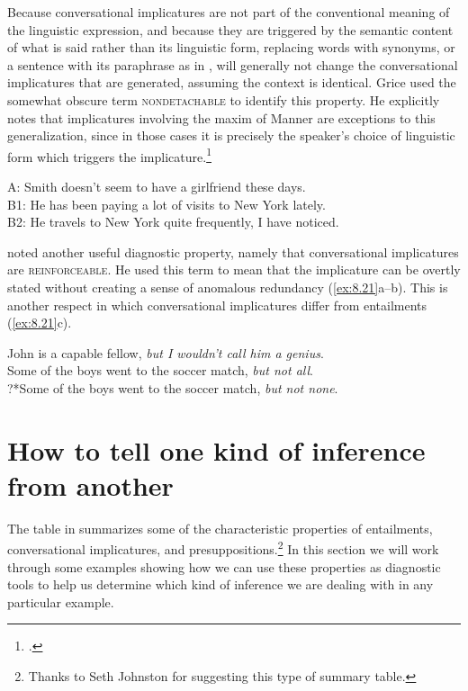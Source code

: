 Because conversational implicatures are not part of the conventional meaning of the linguistic expression, and because they are triggered by the semantic content of what is said rather than its linguistic form, replacing words with synonyms, or a sentence with its paraphrase as in , will generally not change the conversational implicatures that are generated, assuming the context is identical. Grice used the somewhat obscure term \textsc{nondetachable} to identify this property. He explicitly notes that implicatures involving the maxim of Manner are exceptions to this generalization, since in those cases it is precisely the speaker’s choice of linguistic form which triggers the implicature.\footnote{\citet[58]{Grice1975}.}


\ea \label{ex:8.20}
A: Smith doesn’t seem to have a girlfriend these days.\\
B1: He has been paying a lot of visits to New York lately.\\
B2: He travels to New York quite frequently, I have noticed.
\z


\citet[294]{Sadock1978} noted another useful diagnostic property, namely that conversational implicatures are \textsc{reinforceable}. He used this term to mean that the implicature can be overtly stated without creating a sense of anomalous redundancy (\ref{ex:8.21}a--b). This is another respect in which conversational implicatures differ from entailments (\ref{ex:8.21}c).


\ea \label{ex:8.21}
\ea John is a capable fellow, \textit{but I wouldn’t call him a genius}.\\
\ex Some of the boys went to the soccer match, \textit{but not all}.\\
\ex ?*Some of the boys went to the soccer match, \textit{but not none}.
                       \z
\z

\section{How to tell one kind of inference from another}\label{sec:8.6}

The table in  summarizes some of the characteristic properties of entailments, conversational implicatures, and presuppositions.\footnote{Thanks to Seth Johnston for suggesting this type of summary table.} In this section we will work through some examples showing how we can use these properties as diagnostic tools to help us determine which kind of inference we are dealing with in any particular example.



